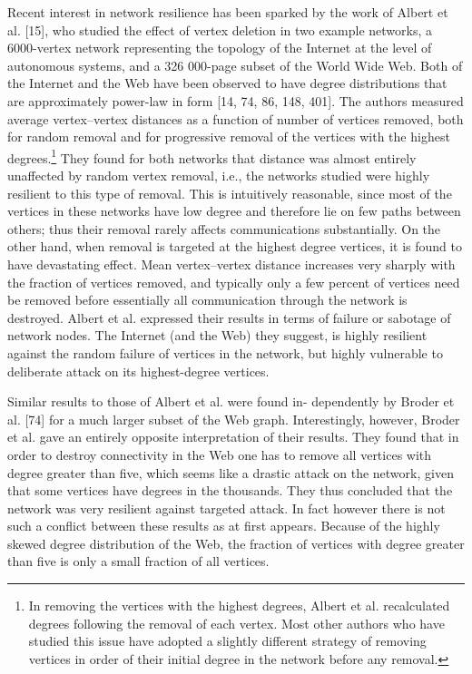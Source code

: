       Recent interest in network resilience has been sparked by the work of Albert et al. [15], who studied the effect of vertex deletion in two example networks, a 6000-vertex network representing the topology of the Internet at the level of autonomous systems, and a 326 000-page subset of the World Wide Web. Both of the Internet and the Web have been observed to have degree distributions that are approximately power-law in form [14, 74, 86, 148, 401]. The authors measured average vertex–vertex distances as a function of number of vertices removed, both for random removal and for progressive removal of the vertices with the highest degrees.\footnote{In removing the vertices with the highest degrees, Albert et al. recalculated degrees following the removal of each vertex. Most other authors who have studied this issue have adopted a slightly different strategy of removing vertices in order of their initial degree in the network before any removal.} They found for both networks that distance was almost entirely unaffected by random vertex removal, i.e., the networks studied were highly resilient to this type of removal. This is intuitively reasonable, since most of the vertices in these networks have low degree and therefore lie on few paths between others; thus their removal rarely affects communications substantially. On the other hand, when removal is targeted at the highest degree vertices, it is found to have devastating effect. Mean vertex–vertex distance increases very sharply with the fraction of vertices removed, and typically only a few percent of vertices need be removed before essentially all communication through the network is destroyed. Albert et al. expressed their results in terms of failure or sabotage of network nodes. The Internet (and the Web) they suggest, is highly resilient against the random failure of vertices in the network, but highly vulnerable to deliberate attack on its highest-degree vertices.
      
      Similar results to those of Albert et al. were found in- dependently by Broder et al. [74] for a much larger subset of the Web graph. Interestingly, however, Broder et al. gave an entirely opposite interpretation of their results. They found that in order to destroy connectivity in the Web one has to remove all vertices with degree greater than five, which seems like a drastic attack on the network, given that some vertices have degrees in the thousands. They thus concluded that the network was very resilient against targeted attack. In fact however there is not such a conflict between these results as at first appears. Because of the highly skewed degree distribution of the Web, the fraction of vertices with degree greater than five is only a small fraction of all vertices.
      
